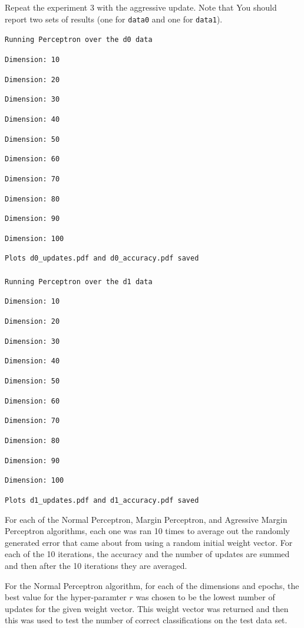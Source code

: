 \begin{enumerate}
  Repeat the experiment 3 with the aggressive update. Note that You
  should report two sets of results (one for {\tt data0} and one for
  {\tt data1}).

  \verb~Running Perceptron over the d0 data~

    \verb~Dimension: 10~

    \verb~Dimension: 20~

    \verb~Dimension: 30~

    \verb~Dimension: 40~

    \verb~Dimension: 50~

    \verb~Dimension: 60~

    \verb~Dimension: 70~

    \verb~Dimension: 80~

    \verb~Dimension: 90~

    \verb~Dimension: 100~

\verb~Plots d0_updates.pdf and d0_accuracy.pdf saved~
\ \\\ \\
\verb~Running Perceptron over the d1 data~

\verb~Dimension: 10~

    \verb~Dimension: 20~

    \verb~Dimension: 30~

    \verb~Dimension: 40~

    \verb~Dimension: 50~

    \verb~Dimension: 60~

    \verb~Dimension: 70~

    \verb~Dimension: 80~

    \verb~Dimension: 90~

    \verb~Dimension: 100~

\verb~Plots d1_updates.pdf and d1_accuracy.pdf saved~

For each of the Normal Perceptron, Margin Perceptron, and Agressive Margin Perceptron
algorithms, each one was ran 10 times to average out the randomly generated error that
came about from using a random initial weight vector. For each of the 10 iterations, the
accuracy and the number of updates are summed and then after the 10 iterations they
are averaged.

For the Normal Perceptron algorithm, for each of the dimensions and epochs, the best
value for the hyper-paramter $r$ was chosen to be the lowest number of updates for
the given weight vector. This weight vector was returned and then this was used to
test the number of correct classifications on the test data set.


\end{enumerate}

